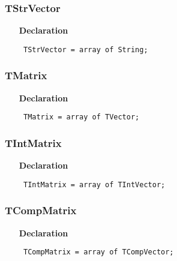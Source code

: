 \documentclass[12pt,a4paper,oneside]{report}
\newcommand{\declarationitem}[1]{\textbf{#1}}
\newcommand{\code}[1]{\texttt{#1}}
\begin{document}
\subsubsection{TStrVector}
\label{utypes-TStrVector}
\begin{itemize}\item[\declarationitem{Declaration}\hfill]
	\begin{flushleft}
		\code{
			TStrVector  = array of String;}
		
	\end{flushleft}
	
\end{itemize}
\subsubsection{TMatrix}
\label{utypes-TMatrix}
\begin{itemize}\item[\declarationitem{Declaration}\hfill]
	\begin{flushleft}
		\code{
			TMatrix     = array of TVector;}
		
	\end{flushleft}
	
\end{itemize}
\subsubsection{TIntMatrix}
\label{utypes-TIntMatrix}
\begin{itemize}\item[\declarationitem{Declaration}\hfill]
	\begin{flushleft}
		\code{
			TIntMatrix  = array of TIntVector;}
		
	\end{flushleft}
	
\end{itemize}
\subsubsection{TCompMatrix}
\label{utypes-TCompMatrix}
\begin{itemize}\item[\declarationitem{Declaration}\hfill]
	\begin{flushleft}
		\code{
			TCompMatrix = array of TCompVector;}
		
	\end{flushleft}
	
\end{itemize}
\end{document}
